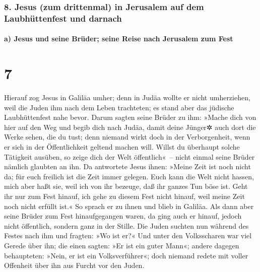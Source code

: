 \hypertarget{jesus-zum-drittenmal-in-jerusalem-auf-dem-laubhuxfcttenfest-und-darnach}{%
\subsubsection{8. Jesus (zum drittenmal) in Jerusalem auf dem
Laubhüttenfest und
darnach}\label{jesus-zum-drittenmal-in-jerusalem-auf-dem-laubhuxfcttenfest-und-darnach}}

\hypertarget{a-jesus-und-seine-bruxfcder-seine-reise-nach-jerusalem-zum-fest}{%
\paragraph{a) Jesus und seine Brüder; seine Reise nach Jerusalem zum
Fest}\label{a-jesus-und-seine-bruxfcder-seine-reise-nach-jerusalem-zum-fest}}

\hypertarget{section-6}{%
\section{7}\label{section-6}}

 Hierauf zog Jesus in Galiläa umher; denn in Judäa wollte
er nicht umherziehen, weil die Juden ihm nach dem Leben trachteten;
 es stand aber das jüdische Laubhüttenfest nahe bevor.
 Darum sagten seine Brüder zu ihm: »Mache dich von hier
auf den Weg und begib dich nach Judäa, damit deine Jünger✲ auch dort die
Werke sehen, die du tust;  denn niemand wirkt doch in der
Verborgenheit, wenn er sich in der Öffentlichkeit geltend machen will.
Willst du überhaupt solche Tätigkeit ausüben, so zeige dich der Welt
öffentlich«~--  nicht einmal seine Brüder nämlich glaubten
an ihn.  Da antwortete Jesus ihnen: »Meine Zeit ist noch
nicht da; für euch freilich ist die Zeit immer gelegen. 
Euch kann die Welt nicht hassen, mich aber haßt sie, weil ich von ihr
bezeuge, daß ihr ganzes Tun böse ist.  Geht ihr nur zum
Fest hinauf, ich gehe zu diesem Fest nicht hinauf, weil meine Zeit noch
nicht erfüllt ist.«  So sprach er zu ihnen und blieb in
Galiläa.  Als dann aber seine Brüder zum Fest
hinaufgegangen waren, da ging auch er hinauf, jedoch nicht öffentlich,
sondern ganz in der Stille.  Die Juden suchten nun
während des Festes nach ihm und fragten: »Wo ist er?« 
Und unter den Volksscharen war viel Gerede über ihn; die einen sagten:
»Er ist ein guter Mann«; andere dagegen behaupteten: »Nein, er ist ein
Volksverführer«;  doch niemand redete mit voller
Offenheit über ihn aus Furcht vor den Juden.

